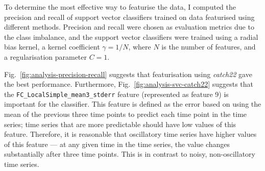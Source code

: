 To determine the most effective way to featurise the data, I computed the precision and recall of support vector classifiers trained on data featurised using different methods.
Precision and recall were chosen as evaluation metrics due to the class imbalance, and the support vector classifiers were trained using a radial bias kernel, a kernel coefficient $\gamma = 1/N$, where $N$ is the number of features, and a regularisation parameter $C = 1$.

Fig.\ \ref{fig:analysis-precision-recall} suggests that featurisation using \textit{catch22} gave the best performance.
Furthermore, Fig.\ \ref{fig:analysis-svc-catch22} suggests that the \texttt{FC\_LocalSimple\_mean3\_stderr} feature (represented as feature 9) is important for the classifier.
This feature is defined as the error based on using the mean of the previous three time points to predict each time point in the time series; time series that are more predictable should have low values of this feature.
Therefore, it is reasonable that oscillatory time series have higher values of this feature --- at any given time in the time series, the value changes substantially after three time points.
This is in contrast to noisy, non-oscillatory time series.


